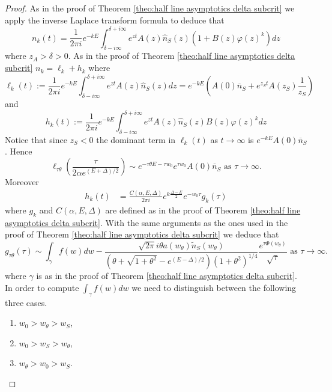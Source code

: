 \documentclass{article}
\numberwithin{equation}{section}
\theoremstyle{plain}
\begin{document}
\begin{proof}
As in the proof of Theorem \ref{theo:half line asymptotics delta subcrit} we apply the inverse Laplace transform formula to deduce that
\[
n_k(t)= \frac{1}{2 \pi i } e^{- k E } \int_{\delta - i \infty }^{\delta + i \infty } e^{ zt } A(z) \hat{n}_S(z) \left( 1+ B(z)  \varphi(z)^k  \right) dz   
\]
where $z_A > \delta > 0 $. 
As in the proof of Theorem \ref{theo:half line asymptotics delta subcrit} $n_k=\ell_k+ h_k$ where  
\begin{equation} \label{lk}
\ell_k (t):= \frac{1}{2 \pi i } e^{- k E } \int_{\delta - i \infty }^{\delta + i \infty } e^{ zt } A(z) \hat{n}_S(z)  dz = e^{- k E } \left( A(0) \overline {n}_S + e^{ z_S t } A(z_S ) \frac{1}{z_S} \right)
\end{equation}
and 
\begin{equation}\label{def:h_k2}
h_k (t):= \frac{1}{2 \pi i } e^{- k E } \int_{\delta - i \infty }^{\delta + i \infty } e^{ zt } A(z) \hat{n}_S(z) B(z) \varphi(z)^k   dz
\end{equation}
Notice that since $ z_S <0 $ the dominant term in $ \ell_k(t)$ as $t \rightarrow \infty $ is $ e^{- k E } A(0) \overline {n}_S $. Hence
\[
\ell_{\tau \theta } \left( \frac{\tau }{ 2 \alpha e^{(E+\Delta)/2} }\right)  \sim  e^{- \tau \theta E - \tau w_0 } e^{ \tau w_0 } A(0) \overline {n}_S  \text{ as } \tau \to \infty. 
\]
Moreover 
\begin{align*}
h_k(t)&=   \frac{C(\alpha, E, \Delta)}{2 \pi i } e^{k \frac{\Delta - E }{2}}e^{- w_0 \tau }g_k(\tau ) 
\end{align*}
where $g_k$ and $C(\alpha, E, \Delta)$  are defined as in the proof of Theorem \ref{theo:half line asymptotics delta subcrit}. 
With the same arguments as the ones used in the proof of Theorem \ref{theo:half line asymptotics delta subcrit} we deduce that 
\[
g_{\tau \theta } (\tau)  \sim  \int_{\gamma}f(w) dw -  \frac{    \sqrt{2\pi} i \theta a(w_\theta ) \tilde{n}_S(w_\theta )}{(\theta+ \sqrt{1+ \theta^2 } - e^{(E-\Delta)/2}) (1+\theta^2)^{1/4}} \frac{ e^{ \tau \Phi(w_\theta ) }}{\sqrt{\tau}} \text{ as } \tau \to \infty. 
\]
where $\gamma  $ is as in the proof of Theorem \ref{theo:half line asymptotics delta subcrit}. 
In order to compute $\int_{\gamma}f(w) dw$ we need to distinguish between the following three cases. 
\begin{enumerate} 
\item $w_0 > w_\theta > w_S  $, 
\item $ w_0 > w_S > w_\theta $, 
\item $ w_\theta > w_0> w_S $.
\end{enumerate}



\end{proof}
\end{document}
